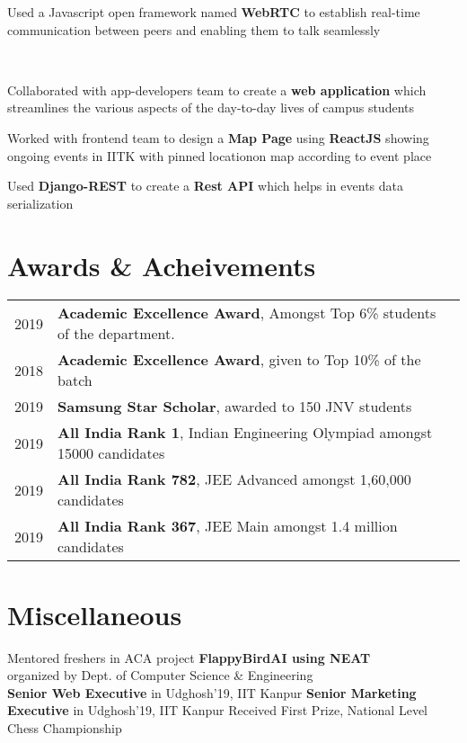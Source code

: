 \documentclass[]{deedy-resume-openfont}
\begin{document}
\begin{minipage}[t]{0.66\textwidth}
\begin{tightemize}
	\item Used a Javascript open framework named \textbf{WebRTC} to establish real-time communication between peers and enabling them to talk seamlessly
\end{tightemize}
\\
\begin{tightemize}
	\item Collaborated with app-developers team to create a \textbf{web application} which streamlines the various aspects of the day-to-day lives of campus students
	\item Worked with frontend team to design a \textbf{Map Page} using \textbf{ReactJS} showing ongoing events in IITK with pinned locationon map according to event place
	\item Used \textbf{Django-REST} to create  a \textbf{Rest API} which helps in events data serialization
\end{tightemize}

\section{Awards \& Acheivements} 
\begin{tabular}{rll}
2019	  & \textbf{Academic Excellence Award}, Amongst Top 6\% students of the department.\\
2018	  &\textbf{Academic Excellence Award}, given to Top 10\% of the batch\\
2019	  & \textbf{Samsung Star Scholar}, awarded to 150 JNV students\\
2019	  & \textbf{All India Rank 1}, Indian Engineering Olympiad amongst 15000 candidates\\
2019	  & \textbf{All India Rank 782}, JEE Advanced amongst 1,60,000 candidates\\
2019	  & \textbf{All India Rank 367}, JEE Main
amongst 1.4 million candidates
\end{tabular}

\section{Miscellaneous} 

\textbullet{} Mentored freshers in ACA project \textbf{{ FlappyBirdAI using NEAT}} \\
\hspace{2mm} organized by Dept. of Computer Science \& Engineering\\
\textbullet{} \textbf{ Senior Web Executive} in Udghosh'19, IIT Kanpur
\newline
\textbullet{} \textbf{ Senior Marketing Executive} in Udghosh'19, IIT Kanpur
\newline
\textbullet{} Received First Prize, National Level Chess Championship  

\end{minipage} 
\end{document}
